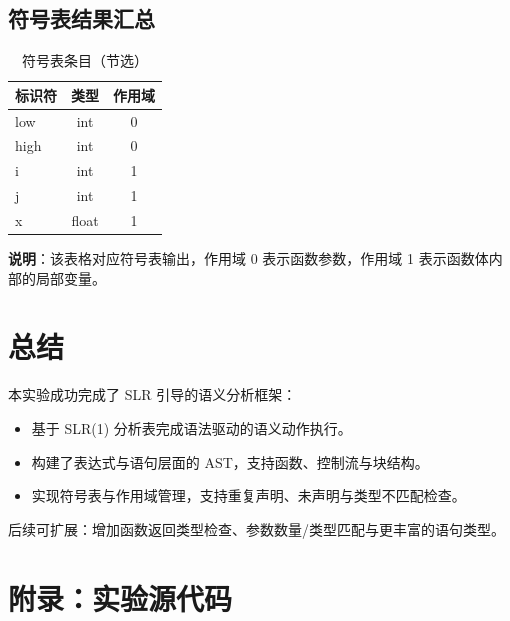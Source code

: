 \documentclass[12pt,a4paper]{ctexart}
\begin{document}
\subsection{符号表结果汇总}
\begin{table}[H]
\centering
\caption{符号表条目（节选）}
\label{tab:symbols}
\begin{tabular}{lcc}
\toprule
标识符 & 类型 & 作用域 \\
\midrule
low  & int   & 0 \\
high & int   & 0 \\
i    & int   & 1 \\
j    & int   & 1 \\
x    & float & 1 \\
\bottomrule
\end{tabular}
\end{table}
\textbf{说明}：该表格对应符号表输出，作用域 0 表示函数参数，作用域 1 表示函数体内部的局部变量。

\section{总结}
本实验成功完成了 SLR 引导的语义分析框架：
\begin{itemize}
	\item 基于 SLR(1) 分析表完成语法驱动的语义动作执行。
	\item 构建了表达式与语句层面的 AST，支持函数、控制流与块结构。
	\item 实现符号表与作用域管理，支持重复声明、未声明与类型不匹配检查。
\end{itemize}
后续可扩展：增加函数返回类型检查、参数数量/类型匹配与更丰富的语句类型。

\section*{附录：实验源代码}
\end{document}
